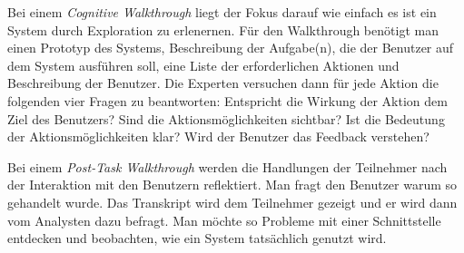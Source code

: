  Bei einem \textit{Cognitive Walkthrough} liegt der Fokus darauf wie einfach es ist ein System durch Exploration zu erlenernen.
 Für den Walkthrough benötigt man einen Prototyp des Systems, Beschreibung der Aufgabe(n), die der Benutzer auf dem System ausführen
 soll, eine Liste der erforderlichen Aktionen und Beschreibung der Benutzer. Die Experten versuchen dann für jede Aktion die 
 folgenden vier Fragen zu beantworten:
 \break
Entspricht die Wirkung der Aktion dem Ziel des Benutzers?
\break
Sind die Aktionsmöglichkeiten sichtbar?
\break
Ist die Bedeutung der Aktionsmöglichkeiten klar?
\break
Wird der Benutzer das Feedback verstehen? 

Bei einem \textit{Post-Task Walkthrough} werden die Handlungen der Teilnehmer nach der Interaktion mit den Benutzern reflektiert.
Man fragt den Benutzer warum so gehandelt wurde.
Das Transkript wird dem Teilnehmer gezeigt und er wird dann vom Analysten dazu befragt.
Man möchte so Probleme mit einer Schnittstelle entdecken und beobachten, wie ein System tatsächlich genutzt wird. 
